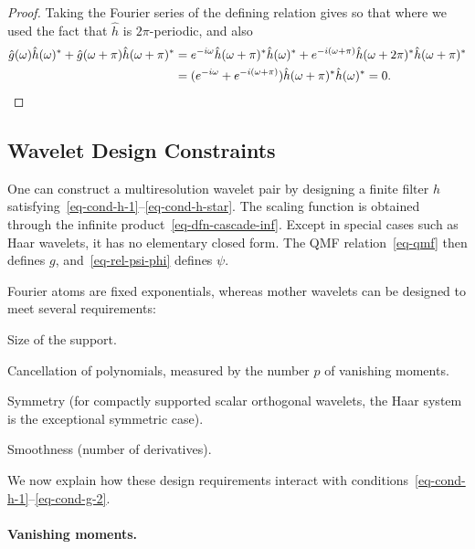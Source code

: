 \begin{proof}
	Taking the Fourier series of the defining relation gives
	so that 
	where we used the fact that $\hat h$ is $2\pi$-periodic, 
	and also 
	\begin{align*}
		\hat g(\omega) \hat h(\omega)^* + \hat g(\omega+\pi) \hat h(\omega+\pi)^* &= 
		e^{-i \omega} \hat h(\omega+\pi)^* \hat h(\omega)^* + e^{-i (\omega+\pi)} \hat h(\omega+2\pi)^* \hat h(\omega+\pi)^* \\
		&=
		(e^{-i \omega}+e^{-i (\omega+\pi)}) \hat h(\omega+\pi)^* \hat h(\omega)^*
		=0.
	\end{align*}
\end{proof}





\subsection{Wavelet Design Constraints}

One can construct a multiresolution wavelet pair by designing a finite filter $h$ satisfying~\eqref{eq-cond-h-1}--\eqref{eq-cond-h-star}. The scaling function is obtained through the infinite product~\eqref{eq-dfn-cascade-inf}. Except in special cases such as Haar wavelets, it has no elementary closed form. The QMF relation~\eqref{eq-qmf} then defines $g$, and~\eqref{eq-rel-psi-phi} defines $\psi$.

Fourier atoms are fixed exponentials, whereas mother wavelets can be designed to meet several requirements:
\begin{rs}
	\item Size of the support.
	\item Cancellation of polynomials, measured by the number $p$ of vanishing moments.
	\item Symmetry (for compactly supported scalar orthogonal wavelets, the Haar system is the exceptional symmetric case).
	\item Smoothness (number of derivatives).
\end{rs}
We now explain how these design requirements interact with conditions~\eqref{eq-cond-h-1}--\eqref{eq-cond-g-2}.

\paragraph{Vanishing moments.}


